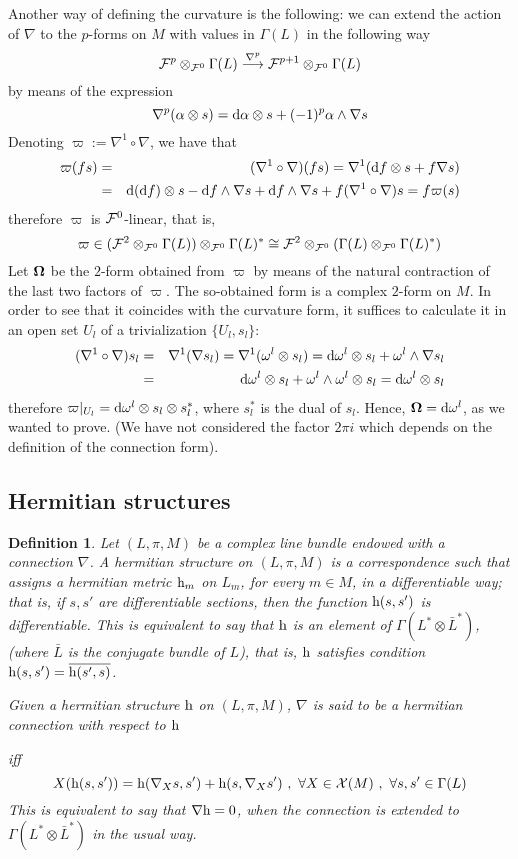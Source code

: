 \documentclass[12pt]{article}
\theoremstyle{plain}
\newtheorem{definition}{Definition}
\def\beann{\begin{eqnarray*}}
\def\eeann{\end{eqnarray*}}
\def\mapping#1{\mathrel{\mathop{\longrightarrow}\limits^{#1}}}
\def\d{{\rm d}}
\def\h{{\rm h}}
\def\curv{{\bf \Omega}}
\begin{document}
Another way of defining the curvature is the following:
we can extend the action of $\nabla$
to the $p$-forms on $M$  with values in $\Gamma (L)$
in the following way
$$
{\cal F}^p \otimes_{{\cal F}^0} \Gamma (L) \mapping{\nabla^p}
{\cal F}^{p+1} \otimes_{{\cal F}^0} \Gamma (L)
$$
by means of the expression
$$
\nabla^p(\alpha \otimes s) =
\d \alpha \otimes s + (-1)^p \alpha \wedge \nabla s
$$
Denoting
$\varpi := \nabla^1 \circ \nabla$,
we have that
\beann
\varpi (fs)&=&(\nabla^1 \circ \nabla )(fs) =
\nabla^1 (\d f \otimes s + f\nabla s)
\\
&=& \d (\d f)\otimes s - \d f \wedge \nabla s
+ \d f \wedge \nabla s + f(\nabla^1 \circ \nabla )s
=f\varpi (s)
\eeann
therefore $\varpi$ is ${\cal F}^0$-linear,
that is,
$$
\varpi \in ({\cal F}^2 \otimes_{{\cal F}^0} \Gamma (L))
\otimes_{{\cal F}^0} \Gamma (L)^*
\cong {\cal F}^2 \otimes_{{\cal F}^0} (\Gamma (L)
\otimes_{{\cal F}^0} \Gamma (L)^*)
$$
Let $\curv $ be the $2$-form
obtained from $\varpi$ by means of the
natural contraction of the last two factors of $\varpi$.
The so-obtained form is a complex $2$-form on $M$.
In order to see that it coincides
with the curvature form,
it suffices to calculate it in an open set $U_l$
of a trivialization $\{ U_l,s_l \}$:
\beann
(\nabla^1 \circ \nabla )s_l
&=&
\nabla^1 (\nabla s_l) =
\nabla^1 (\omega^l  \otimes s_l) =
\d \omega^l  \otimes s_l + \omega^l  \wedge \nabla s_l
\\
&=&
\d \omega^l  \otimes s_l + \omega^l  \wedge \omega^l \otimes s_l =
\d \omega^l  \otimes s_l
\eeann
therefore
$\varpi \vert_{U_l} = \d \omega^l  \otimes s_l \otimes s_l^*$,
where $s_l^*$ is the dual of $s_l$.
Hence, $\curv  = \d \omega^l $,
as we wanted to prove.
(We have not considered the factor
$2\pi i$ which depends on the definition of the connection form).



\subsection{Hermitian structures}


\begin{definition}
Let $(L,\pi ,M)$ be a complex line bundle
endowed with a connection $\nabla$.
A {\rm hermitian structure} on $(L,\pi ,M)$
is a correspondence such that assigns
a {\it hermitian metric} $\h_m$ on $L_m$, for every $m \in M$,
in a differentiable way; that is, if $s, s'$ are differentiable
sections,
then the function $\h (s,s')$ is differentiable.
This is equivalent to say that $\h$ is an element of
$\Gamma(L^* \otimes \bar L^*)$,
(where $\bar L$ is the conjugate bundle of $L$),
that is, $\h$ satisfies condition $\h(s,s') = \overline{\h(s',s)}$.

Given a hermitian structure $\h$ on $(L,\pi ,M)$,
$\nabla$ is said to be a {\rm hermitian connection} with respect to $\h$

iff
$$
X(\h (s,s')) = \h (\nabla_X s,s') + \h (s,\nabla_X s')
\ , \
\forall X \in {\cal X}(M)
\ , \
\forall s,s' \in \Gamma (L)
$$
This is equivalent to say that $\nabla \h = 0$,
when the connection is extended to $\Gamma(L^* \otimes \bar L^*)$
in the usual way.
\label{hs}
\end{definition}
\end{document}
